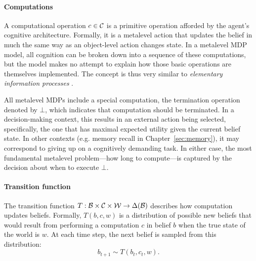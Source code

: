 \paragraph{Computations}
A computational operation $c \in \mathcal{C}$ is a primitive operation afforded by the agent's cognitive architecture. Formally, it is a metalevel action that updates the belief in much the same way as an object-level action changes state. In a metalevel MDP model, all cognition can be broken down into a sequence of these computations, but the model makes no attempt to explain how those basic operations are themselves implemented. The concept is thus very similar to \emph{elementary information processes} \citep{chase1978elementary,simon1979information,posner1982information,payne1988adaptive}. 

All metalevel MDPs include a special computation, the termination operation denoted by $\bot$, which indicates that computation should be terminated. In a decision-making context, this results in an external action being selected, specifically, the one that has maximal expected utility given the current belief state. In other contexts (e.g. memory recall in Chapter~\ref{sec:memory}), it may correspond to giving up on a cognitively demanding task. In either case, the most fundamental metalevel problem---how long to compute---is captured by the decision about when to execute $\bot$.

\paragraph{Transition function}
The transition function $T: \mathcal{B} \times \mathcal{C} \times \mathcal{W} \rightarrow \Delta(\mathcal{B})$ describes how computation updates beliefs. Formally, $T(b, c, w)$ is a distribution of possible new beliefs that would result from performing a computation $c$ in belief $b$ when the true state of the world is $w$. At each time step, the next belief is sampled from this distribution:
\begin{equation}
b_{t+1} \sim T(b_t, c_t, w).
\end{equation}

